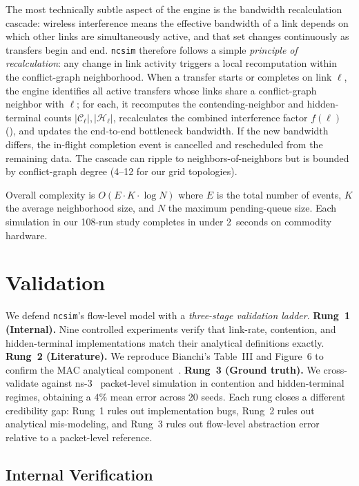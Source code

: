 \documentclass[conference]{IEEEtran}
\newcommand{\ncsim}{\texttt{ncsim}}
\begin{document}
The most technically subtle aspect of the engine is the bandwidth
recalculation cascade: wireless interference means the effective
bandwidth of a link depends on which other links are simultaneously
active, and that set changes continuously as transfers begin and end.
\ncsim{} therefore follows a simple \emph{principle of recalculation}:
any change in link activity triggers a local recomputation within the
conflict-graph neighborhood.  When a transfer starts or completes on
link $\ell$, the engine identifies all active transfers whose links
share a conflict-graph neighbor with $\ell$; for each, it recomputes
the contending-neighbor and hidden-terminal counts $|\mathcal{C}_\ell|,
|\mathcal{H}_\ell|$, recalculates the combined interference factor
$f(\ell)$ (), and updates the end-to-end bottleneck
bandwidth.  If the new bandwidth differs, the in-flight completion
event is cancelled and rescheduled from the remaining data.  The cascade
can ripple to neighbors-of-neighbors but is bounded by conflict-graph
degree (4--12 for our grid topologies).

Overall complexity is $O(E \cdot K \cdot \log N)$ where $E$ is the total
number of events, $K$ the average neighborhood size, and $N$ the maximum
pending-queue size.  Each simulation in our 108-run study completes in
under 2~seconds on commodity hardware.


\section{Validation}
\label{sec:validation}

We defend \ncsim{}'s flow-level model with a \emph{three-stage
validation ladder}.
\textbf{Rung~1 (Internal).}  Nine controlled experiments verify that
link-rate, contention, and hidden-terminal implementations match their
analytical definitions exactly.
\textbf{Rung~2 (Literature).}  We reproduce Bianchi's Table~III and
Figure~6 to confirm the MAC analytical component~\cite{bianchi2000}.
\textbf{Rung~3 (Ground truth).}  We cross-validate against
ns-3~\cite{ns3} packet-level simulation in contention and
hidden-terminal regimes, obtaining a 4\% mean error across 20 seeds.
Each rung closes a different credibility gap: Rung~1 rules out
implementation bugs, Rung~2 rules out analytical mis-modeling, and
Rung~3 rules out flow-level abstraction error relative to a
packet-level reference.

\subsection{Internal Verification}
\label{sec:internal_val}
\end{document}
